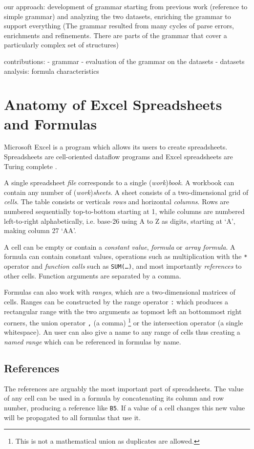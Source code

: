 \documentclass[conference]{IEEEtran}
\begin{document}
our approach:
development of grammar starting from previous work (reference to simple grammar) and analyzing the two datasets, enriching the
grammar to support everything
(The grammar resulted from many cycles of parse errors, enrichments and refinements. There are parts of the grammar that cover a particularly complex set of structures)

contributions:
- grammar
- evaluation of the grammar on the datasets
- datasets analysis: formula characteristics

\section{Anatomy of Excel Spreadsheets and Formulas}

Microsoft Excel is a program which allows its users to create spreadsheets.
Spreadsheets are cell-oriented dataflow programs and Excel spreadsheets are Turing complete \cite{ExcelTuringComplete}.

A single spreadsheet \emph{file} corresponds to a single (\emph{work})\emph{book}.
A workbook can contain any number of (\emph{work})\emph{sheets}.
A sheet consists of a two-dimensional grid of \emph{cells}.
The table consists or verticals \emph{rows} and horizontal \emph{columns}.
Rows are numbered sequentially top-to-bottom starting at 1, while columns are numbered left-to-right alphabetically, i.e. base-26 using A to Z as digits, starting at `A', making column 27 `AA'.

A cell can be empty or contain a \emph{constant value}, \emph{formula} or \emph{array formula}.
A formula can contain constant values, operations such as multiplication with the \texttt{*} operator and \emph{function calls} such as \texttt{SUM(\ldots)}, and most importantly \emph{references} to other cells.
Function arguments are separated by a comma.

Formulas can also work with \emph{ranges}, which are a two-dimensional matrices of cells.
Ranges can be constructed by the range operator \texttt{:} which produces a rectangular range with the two arguments as topmost left an bottommost right corners, the union operator \texttt{,} (a comma) \footnote{This is not a mathematical union as duplicates are allowed.} or the intersection operator \texttt{} (a single whitespace). 
An user can also give a name to any range of cells thus creating a \emph{named range} which can be referenced in formulas by name.

\subsection{References}
The references are arguably the most important part of spreadsheets.
The value of any cell can be used in a formula by concatenating its column and row number, producing a reference like \texttt{B5}.
If a value of a cell changes this new value will be propagated to all formulas that use it.
\end{document}
